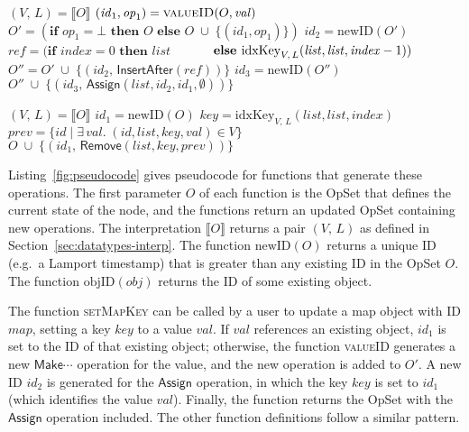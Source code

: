 \begin{algorithm}[t]
\begin{minipage}[t]{0.5\textwidth}
\begin{algorithmic}
    \State $(V,\, L) = \llbracket O \rrbracket$
    \State $(\mathit{id}_1, \mathit{op}_1) = \Call{valueID}{O, \mathit{val}}$
    \State $O' = (\textbf{if } \mathit{op}_1 = \bot \textbf{ then } O \textbf{ else } 
        O \;\cup\; \big\{ (\mathit{id}_1, \mathit{op}_1) \big\})$
    \State $\mathit{id}_2 = \mathrm{newID}(O')$
    \State $\mathit{ref} = (\textbf{if } \mathit{index}=0 \textbf{ then } \mathit{list}$
    \State $\hphantom{\mathit{ref} = (}\textbf{else } \mathrm{idxKey}_{V,\, L}(\mathit{list}, \mathit{list}, \mathit{index} - 1))$
    \State $O'' = O' \;\cup\; \big\{ (\mathit{id}_2,\, \mathsf{InsertAfter}(\mathit{ref})) \big\}$
    \State $\mathit{id}_3 = \mathrm{newID}(O'')$
    \State \Return $O'' \;\cup\; \big\{ (\mathit{id}_3,\, \mathsf{Assign}(\mathit{list}, \mathit{id}_2, \mathit{id}_1, \emptyset)) \big\}$
    \EndFunction\Statex

    \State $(V,\, L) = \llbracket O \rrbracket$
    \State $\mathit{id}_1 = \mathrm{newID}(O)$
    \State $\mathit{key} = \mathrm{idxKey}_{V,\, L}(\mathit{list}, \mathit{list}, \mathit{index})$
    \State $\mathit{prev} = \{ \mathit{id} \mid \exists\,\mathit{val}.\; (\mathit{id}, \mathit{list}, \mathit{key}, \mathit{val}) \in V \}$
    \State \Return $O \;\cup\; \big\{ (\mathit{id}_1,\, \mathsf{Remove}(\mathit{list}, \mathit{key}, \mathit{prev})) \big\}$
    \EndFunction
\end{algorithmic}
\end{minipage}
\end{algorithm}

\noindent
Listing~\ref{fig:pseudocode} gives pseudocode for functions that generate these operations.
The first parameter $O$ of each function is the OpSet that defines the current state of the node, and the functions return an updated OpSet containing new operations.
The interpretation $\llbracket O \rrbracket$ returns a pair $(V,\, L)$ as defined in Section~\ref{sec:datatypes-interp}.
The function $\mathrm{newID}(O)$ returns a unique ID (e.g.\ a Lamport timestamp) that is greater than any existing ID in the OpSet $O$.
The function $\mathrm{objID}(\mathit{obj})$ returns the ID of some existing object.

The function \textsc{setMapKey} can be called by a user to update a map object with ID $\mathit{map}$, setting a key $\mathit{key}$ to a value $\mathit{val}$.
If $\mathit{val}$ references an existing object, $\mathit{id}_1$ is set to the ID of that existing object; otherwise, the function \textsc{valueID} generates a new $\mathsf{Make}\cdots$ operation for the value, and the new operation is added to $O'$.
A new ID $\mathit{id}_2$ is generated for the $\mathsf{Assign}$ operation, in which the key $\mathit{key}$ is set to $\mathit{id}_1$ (which identifies the value $\mathit{val}$).
Finally, the function returns the OpSet with the $\mathsf{Assign}$ operation included.
The other function definitions follow a similar pattern.

